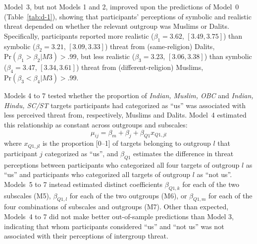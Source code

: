 \documentclass[12pt, a4paper]{article}
\begin{document}
Model~3, but not Models 1 and 2, improved upon the predictions of Model~0 (Table~\ref{tab:d-1}), showing that participants' perceptions of symbolic and realistic threat depended on whether the relevant outgroup was Muslims or Dalits. Specifically, participants reported more realistic ($ \beta_1 = 3.62$, $[3.49, 3.75]$) than symbolic ($\beta_2 = 3.21$, $[3.09, 3.33]$) threat from (same-religion) Dalits, $\text{Pr} (\beta_1 > \beta_2|M3) > .99$, but less realistic ($\beta_3 = 3.23$, $[3.06, 3.38]$) than symbolic ($\beta_4 = 3.47$, $[3.34, 3.61]$) threat from (different-religion) Muslims, $\text{Pr} (\beta_3 < \beta_4| M3) > .99$.

Models 4 to 7 tested whether the proportion of \emph{Indian, Muslim, OBC} and \emph{Indian, Hindu, SC/ST} targets participants had categorized as ``us'' was associated with less perceived threat from, respectively, Muslims and Dalits. Model~4 estimated this relationship as constant across outgroups and subscales: $$ \mu_{ij} = \beta_m + \beta_{j} + \beta_{Q1}x_{Q1,jl} $$ where $x_{Q1,jl}$ is the proportion [0--1] of targets belonging to outgroup $l$ that participant $j$ categorized as ``us'', and $\beta_{Q1}$ estimates the difference in threat perceptions between participants who categorized all four targets of outgroup $l$ as ``us'' and participants who categorized all targets of outgroup $l$ as ``not us''. Models~5 to 7 instead estimated distinct coefficients $\beta_{Q1,k}$ for each of the two subscales (M5), $\beta_{Q1,l}$ for each of the two outgroups (M6), or $\beta_{Q1,m}$ for each of the four combinations of subscales and outgroups (M7). Other than expected, Models~4 to 7 did not make better out-of-sample predictions than Model 3, indicating that whom participants considered ``us'' and ``not us'' was not associated with their perceptions of intergroup threat.

\newpage

\printbibliography
\end{document}
